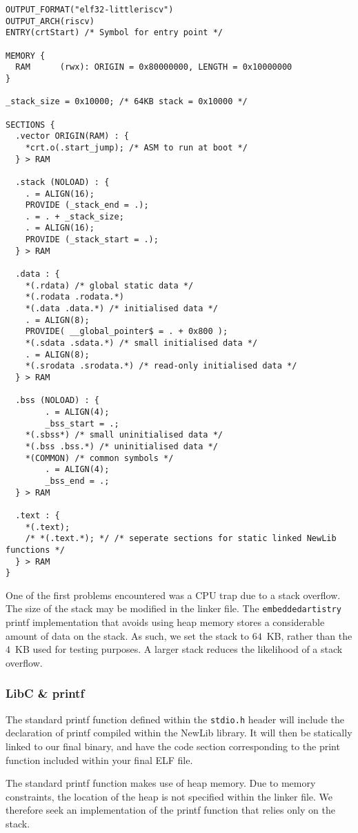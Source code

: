 \documentclass[a4paper,8pt]{report}
\begin{document}
\scriptsize
\begin{verbatim}
OUTPUT_FORMAT("elf32-littleriscv")
OUTPUT_ARCH(riscv)
ENTRY(crtStart) /* Symbol for entry point */

MEMORY {
  RAM      (rwx): ORIGIN = 0x80000000, LENGTH = 0x10000000
}

_stack_size = 0x10000; /* 64KB stack = 0x10000 */

SECTIONS {
  .vector ORIGIN(RAM) : {
    *crt.o(.start_jump); /* ASM to run at boot */
  } > RAM

  .stack (NOLOAD) : {
    . = ALIGN(16);
    PROVIDE (_stack_end = .);
    . = . + _stack_size;
    . = ALIGN(16);
    PROVIDE (_stack_start = .);
  } > RAM

  .data : {
    *(.rdata) /* global static data */
    *(.rodata .rodata.*)
    *(.data .data.*) /* initialised data */
    . = ALIGN(8);
    PROVIDE( __global_pointer$ = . + 0x800 );
    *(.sdata .sdata.*) /* small initialised data */
    . = ALIGN(8);
    *(.srodata .srodata.*) /* read-only initialised data */
  } > RAM

  .bss (NOLOAD) : {
		. = ALIGN(4);
		_bss_start = .;
    *(.sbss*) /* small uninitialised data */
    *(.bss .bss.*) /* uninitialised data */
    *(COMMON) /* common symbols */
		. = ALIGN(4);
		_bss_end = .;
  } > RAM

  .text : {
    *(.text);
    /* *(.text.*); */ /* seperate sections for static linked NewLib functions */
  } > RAM
}
\end{verbatim}
\normalsize

One of the first problems encountered was a CPU trap due to a stack overflow.
The size of the stack may be modified in the linker file. The \texttt{embeddedartistry}
printf implementation that avoids using heap memory stores a considerable amount
of data on the stack. As such, we set the stack to $64$~KB, rather than the
$4$~KB used for testing purposes. A larger stack reduces the likelihood of a
stack overflow.

\subsubsection{LibC \& printf}
The standard printf function defined within the \texttt{stdio.h} header will
include the declaration of printf compiled within the NewLib library. It will
then be statically linked to our final binary, and have the code section
corresponding to the print function included within your final ELF file.

The standard printf function makes use of heap memory. Due to memory
constraints, the location of the heap is not specified within the linker file.
We therefore seek an implementation of the printf function that relies only on
the stack. 
\end{document}
